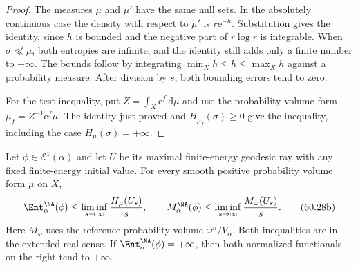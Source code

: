 \begin{proof}
The measures $\mu$ and $\mu'$ have the same null sets. In the absolutely continuous case the density with respect to $\mu'$ is $r\mathrm{e}^{-h}$. Substitution gives the identity, since $h$ is bounded and the negative part of $r\log r$ is integrable. When $\sigma\not\ll\mu$, both entropies are infinite, and the identity still adds only a finite number to $+\infty$. The bounds follow by integrating $\min_Xh\leq h\leq\max_Xh$ against a probability measure. After division by $s$, both bounding errors tend to zero.

For the test inequality, put $Z=\int_X\mathrm{e}^f\,\mathrm{d}\mu$ and use the probability volume form $\mu_f=Z^{-1}\mathrm{e}^f\mu$. The identity just proved and $H_{\mu_f}(\sigma)\geq0$ give the inequality, including the case $H_\mu(\sigma)=+\infty$.
\end{proof}

\begin{theorem}\label{thm:mp-reduced-entropy-slope}
Let $\phi\in\mathcal E^1(\alpha)$ and let $U$ be its maximal finite-energy geodesic ray with any fixed finite-energy initial value. For every smooth positive probability volume form $\mu$ on $X$,
\[
 \Ent_\alpha^{\NA}(\phi)
       \leq\liminf_{s\to\infty}\frac{H_\mu(U_s)}s,
 \qquad
 M_\alpha^{\NA}(\phi)
       \leq\liminf_{s\to\infty}\frac{M_\omega(U_s)}s.
 \tag{60.28b}\label{eq:mp-reduced-entropy-slope}
\]
Here $M_\omega$ uses the reference probability volume $\omega^n/V_\alpha$. Both inequalities are in the extended real sense. If $\Ent_\alpha^{\NA}(\phi)=+\infty$, then both normalized functionals on the right tend to $+\infty$.
\end{theorem}

